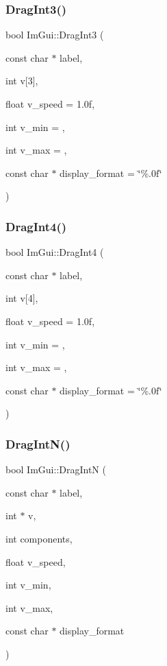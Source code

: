 \subsubsection{\texorpdfstring{Drag\+Int3()}{DragInt3()}}
{\footnotesize\ttfamily bool Im\+Gui\+::\+Drag\+Int3 (\begin{DoxyParamCaption}\item[{const char $\ast$}]{label,  }\item[{int}]{v\mbox{[}3\mbox{]},  }\item[{float}]{v\+\_\+speed = {\ttfamily 1.0f},  }\item[{int}]{v\+\_\+min = {},  }\item[{int}]{v\+\_\+max = {},  }\item[{const char $\ast$}]{display\+\_\+format = {\ttfamily \char`\"{}\%.0f\char`\"{}} }\end{DoxyParamCaption})}

\hypertarget{namespace_im_gui_a65b6e42ba7a4aa73fd3e1dc74f93d180}{}\label{namespace_im_gui_a65b6e42ba7a4aa73fd3e1dc74f93d180} 
\subsubsection{\texorpdfstring{Drag\+Int4()}{DragInt4()}}
{\footnotesize\ttfamily bool Im\+Gui\+::\+Drag\+Int4 (\begin{DoxyParamCaption}\item[{const char $\ast$}]{label,  }\item[{int}]{v\mbox{[}4\mbox{]},  }\item[{float}]{v\+\_\+speed = {\ttfamily 1.0f},  }\item[{int}]{v\+\_\+min = {},  }\item[{int}]{v\+\_\+max = {},  }\item[{const char $\ast$}]{display\+\_\+format = {\ttfamily \char`\"{}\%.0f\char`\"{}} }\end{DoxyParamCaption})}

\hypertarget{namespace_im_gui_a2854d672b818938e6e9fb1de6de3dbe7}{}\label{namespace_im_gui_a2854d672b818938e6e9fb1de6de3dbe7} 
\subsubsection{\texorpdfstring{Drag\+Int\+N()}{DragIntN()}}
{\footnotesize\ttfamily bool Im\+Gui\+::\+Drag\+IntN (\begin{DoxyParamCaption}\item[{const char $\ast$}]{label,  }\item[{int $\ast$}]{v,  }\item[{int}]{components,  }\item[{float}]{v\+\_\+speed,  }\item[{int}]{v\+\_\+min,  }\item[{int}]{v\+\_\+max,  }\item[{const char $\ast$}]{display\+\_\+format }\end{DoxyParamCaption})}

